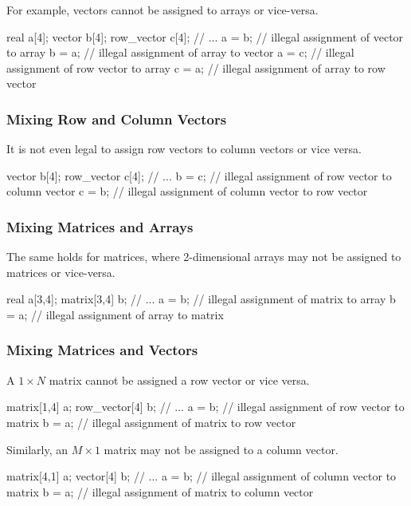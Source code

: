 For example, vectors cannot be assigned to arrays or vice-versa.
%
\begin{stancode}
real a[4];
vector b[4];
row_vector c[4];
// ...
a = b; // illegal assignment of vector to array
b = a; // illegal assignment of array to vector
a = c; // illegal assignment of row vector to array
c = a; // illegal assignment of array to row vector
\end{stancode}

\subsubsection{Mixing Row and Column Vectors}

It is not even legal to assign row vectors to column vectors or vice
versa.
\begin{stancode}
vector b[4];
row_vector c[4];
// ...
b = c; // illegal assignment of row vector to column vector
c = b; // illegal assignment of column vector to row vector
\end{stancode}
%

\subsubsection{Mixing Matrices and Arrays}

The same holds for matrices, where 2-dimensional arrays may not be
assigned to matrices or vice-versa.

\begin{stancode}
real a[3,4];
matrix[3,4] b;
// ...
a = b;  // illegal assignment of matrix to array
b = a;  // illegal assignment of array to matrix
\end{stancode}
%

\subsubsection{Mixing Matrices and Vectors}

A $1 \times N$ matrix cannot be assigned a row vector or
vice versa.
%
\begin{stancode}
matrix[1,4] a;
row_vector[4] b;
// ...
a = b;  // illegal assignment of row vector to matrix
b = a;  // illegal assignment of matrix to row vector
\end{stancode}
%
Similarly, an $M \times 1$ matrix may not be assigned to a column vector.
%
\begin{stancode}
matrix[4,1] a;
vector[4] b;
// ...
a = b;  // illegal assignment of column vector to matrix
b = a;  // illegal assignment of matrix to column vector
\end{stancode}

